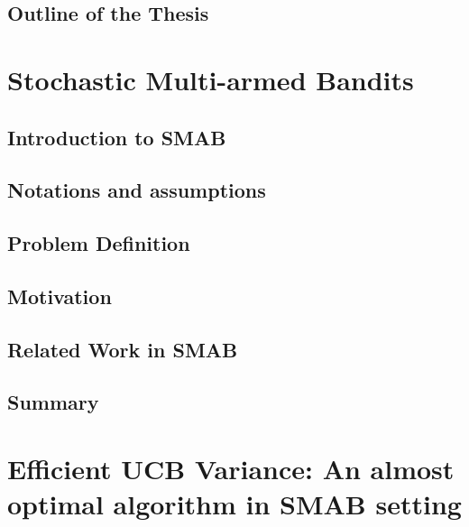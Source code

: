 \documentclass[MS]{iitmdiss}
\begin{document}
\section{Outline of the Thesis}
\label{outline}





\chapter{Stochastic Multi-armed Bandits}
\label{chap:SMAB}

\section{Introduction to SMAB}
\label{sec:intro}


\section{Notations and assumptions}
\label{sec:notations}


\section{Problem Definition}
\label{sec:probDef}


\section{Motivation}
\label{sec:motivation}


\section{Related Work in SMAB}
\label{sec:related}


\section{Summary}
\label{chap2:conc}






\chapter{Efficient UCB Variance: An almost optimal algorithm in SMAB setting}
\label{chap:EUCBV}
\end{document}
